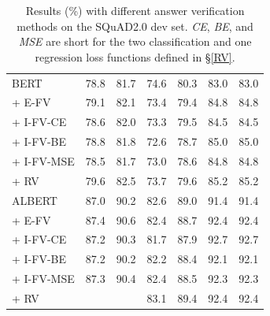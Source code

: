 \documentclass[letterpaper]{article} %
\begin{document}
\begin{table}
\begin{center}
{\begin{tabular}{lllllll}
				\midrule
				BERT  & 78.8 & 81.7  & 74.6 & 80.3 & 83.0 & 83.0 \\
				\quad     + E-FV  & 79.1 & 82.1 & 73.4 & 79.4  & 84.8 & 84.8  \\
				\quad     + I-FV-CE  & 78.6 & 82.0 & 73.3 & 79.5 & 84.5 & 84.5\\
				\quad + I-FV-BE & 78.8 & 81.8 & 72.6 & 78.7 & 85.0 & 85.0\\
				\quad     + I-FV-MSE  & 78.5 & 81.7& 73.0 & 78.6 & 84.8 & 84.8  \\
				\quad     + RV  & 79.6 & 82.5 & 73.7 & 79.6  & 85.2 & 85.2  \\
				\midrule 
				ALBERT  &  87.0 & 90.2 & 82.6 & 89.0 & 91.4 &  91.4  \\
				\quad     + E-FV  & 87.4 & 90.6  & 82.4 & 88.7  & 92.4 &  92.4\\
				\quad   + I-FV-CE  & 87.2 & 90.3 & 81.7 & 87.9 & 92.7 & 92.7 \\
				\quad + I-FV-BE & 87.2 & 90.2 &82.2 &88.4 &92.1 &92.1 \\
				\quad     + I-FV-MSE & 87.3 & 90.4 & 82.4 & 88.5 & 92.3 & 92.3 \\
				\quad      + RV  & \text{87.8} & \text{90.9}  & 83.1 & 89.4 &92.4  &  92.4 \\
				\bottomrule 
			\end{tabular}
		}
	\end{center}
	\caption{\label{tablescore} Results (\%) with different answer verification methods on the SQuAD2.0 dev set. \textit{CE}, \textit{BE}, and \textit{MSE} are short for the two classification and one regression loss functions defined in \S\ref{RV}.}
\end{table}
\end{document}
